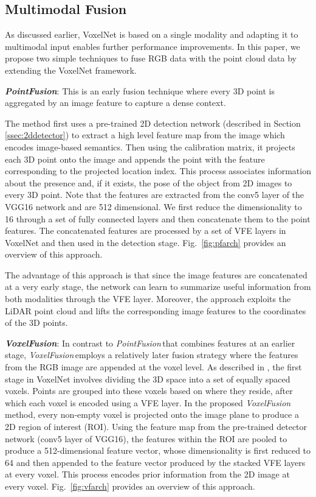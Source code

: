 \documentclass[letterpaper, 10 pt, conference]{ieeeconf}
\newcommand{\PF}{\textit{PointFusion}}
\newcommand{\VF}{\textit{VoxelFusion}}
\begin{document}
\subsection{Multimodal Fusion}
\label{ssec:mfusion}

As discussed earlier, VoxelNet \cite{REF:zhou2017voxelnet} is based on a single modality and adapting it to multimodal input enables further performance improvements. In this paper, we propose two simple techniques to fuse RGB data with the point cloud data by extending the VoxelNet framework. 

\noindent\textbf{\PF}: This is an early fusion technique where every 3D point is aggregated by an image feature to capture a dense context.

The method first uses a pre-trained 2D detection network (described in Section \ref{ssec:2ddetector}) to extract a high level feature map from the image which encodes image-based semantics. Then using the calibration matrix, it projects each 3D point onto the image and appends the point with the feature corresponding to the projected location index. This process associates information about the presence and, if it exists, the pose of the object from 2D images to every 3D point. Note that the features are extracted from the conv5 layer of the VGG16 network and are 512 dimensional. We first reduce the dimensionality to 16 through a set of fully connected layers and then concatenate them to the point features. The concatenated features are processed by a set of VFE layers in VoxelNet and then used in the detection stage. Fig.~\ref{fig:pfarch} provides an overview of this approach. 

The advantage of this approach is that since the image features are concatenated at a very early stage, the network can learn to summarize useful information from both modalities through the VFE layer. Moreover, the approach exploits the LiDAR point cloud and lifts the corresponding image features to the coordinates of the 3D points.


\noindent\textbf{\VF}: In contrast to \PF{\,}that combines features at an earlier stage, \VF{\,}employs a relatively later fusion strategy where the features from the RGB image are appended at the voxel level. As described in \cite{REF:zhou2017voxelnet}, the first stage in VoxelNet involves dividing the 3D space into a set of equally spaced voxels. Points are grouped into these voxels based on where they reside, after which each voxel is encoded using a VFE layer. In the proposed \VF{\,}method, every non-empty voxel is projected onto the image plane to produce a 2D region of interest (ROI). Using the feature map from the pre-trained detector network (conv5 layer of VGG16), the features within the ROI are pooled to produce a 512-dimensional feature vector, whose dimensionality is first reduced to 64 and then appended to the feature vector produced by the stacked VFE layers at every voxel. This process encodes prior information from the 2D image at every voxel. Fig.~\ref{fig:vfarch} provides an overview of this approach.
\end{document}
